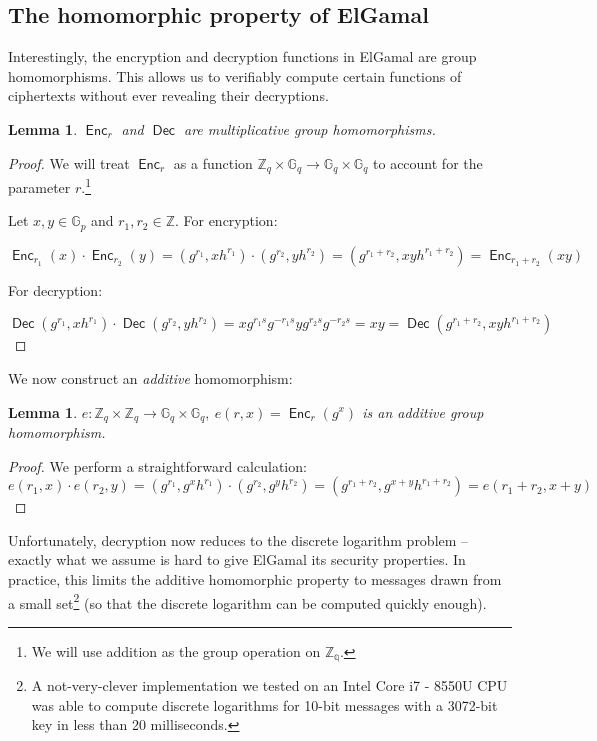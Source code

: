 \documentclass[12pt,a4paper]{article}
\DeclareMathOperator{\Enc}{\mathsf{Enc}}
\DeclareMathOperator{\Dec}{\mathsf{Dec}}
\newtheorem{lemma}[theorem]{Lemma}
\theoremstyle{definition}
\begin{document}
\subsection{The homomorphic property of ElGamal}
Interestingly, the encryption and decryption functions in ElGamal are group homomorphisms. This allows us to verifiably compute certain functions of ciphertexts without ever revealing their decryptions.
\begin{lemma}\label{lem-mul-homom}
    $\Enc_r$ and $\Dec$ are multiplicative group homomorphisms.
\end{lemma}
\begin{proof}
    We will treat $\Enc_r$ as a function $\mathbb{Z}_q\times\mathbb{G}_q\rightarrow\mathbb{G}_q\times\mathbb{G}_q$ to account for the parameter $r$.\footnote{We will use addition as the group operation on $\mathbb{Z_q}$.}

    Let $x,y\in\mathbb{G}_p$ and $r_1,r_2\in\mathbb{Z}$. For encryption:
    
    $$\Enc_{r_1}(x)\cdot\Enc_{r_2}(y)=(g^{r_1},xh^{r_1})\cdot(g^{r_2},yh^{r_2})=(g^{r_1+r_2},xyh^{r_1+r_2})=\Enc_{r_1+r_2}(xy)$$

    For decryption:

    $$\Dec(g^{r_1},xh^{r_1})\cdot\Dec(g^{r_2},yh^{r_2})=xg^{r_1s}g^{-r_1s}yg^{r_2s}g^{-r_2s}=xy=\Dec(g^{r_1+r_2},xyh^{r_1+r_2})$$
\end{proof}

We now construct an \textit{additive} homomorphism:
\begin{lemma}
    $e:\mathbb{Z}_q\times\mathbb{Z}_q\rightarrow\mathbb{G}_q\times\mathbb{G}_q,\ e(r, x)=\Enc_r(g^x)$ is an additive group homomorphism.
\end{lemma}
\begin{proof}
    We perform a straightforward calculation:
    $$e(r_1, x)\cdot e(r_2,y)=(g^{r_1},g^xh^{r_1})\cdot(g^{r_2},g^yh^{r_2})=(g^{r_1+r_2},g^{x+y}h^{r_1+r_2})=e(r_1+r_2, x+y)$$
\end{proof}
Unfortunately, decryption now reduces to the discrete logarithm problem -- exactly what we assume is hard to give ElGamal its security properties. In practice, this limits the additive homomorphic property to messages drawn from a small set\footnote{A not-very-clever implementation we tested on an Intel Core i7 - 8550U CPU was able to compute discrete logarithms for 10-bit messages with a 3072-bit key in less than 20 milliseconds.} (so that the discrete logarithm can be computed quickly enough).
\end{document}
